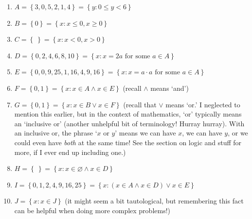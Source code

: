 \documentclass[10pt]{article}
\theoremstyle{definition}
\newcommand{\set}[1]{\left\{ #1 \right\}}
\begin{document}
\begin{enumerate}
    \item $A = \set{3,0,5,2,1,4} = \set{y:0\leq y<6}$
    \item $B = \set{0} = \set{x:x\leq 0, x\geq 0}$
    \item $C = \set{~} = \set{x:x<0,x>0}$
    \item $D = \set{0,2,4,6,8,10} = \set{x:x=2a\text{ for some }a\in A}$
    \item $E = \set{0,0,9,25,1,16,4,9,16} = \set{x:x=a\cdot a \text{ for some }a\in A}$
    \item $F = \set{0,1} = \set{x:x\in A \land x\in E}$ (recall $\land$ means `and')
    \item $G = \set{0,1} = \set{x:x\in B \lor x\in F}$ (recall that $\lor$ means `or.'  I neglected to mention this earlier, but in the context of mathematics, `or' typically means an `inclusive or' (another unhelpful bit of terminology! Hurray hurray).  With an inclusive or, the phrase `$x$ or $y$' means we can have $x$, we can have $y$, or we could even have \emph{both} at the same time!  See the section on logic and stuff for more, if I ever end up including one.)
    \item $H = \set{~} = \set{x:x\in \varnothing\land x\in D}$
    \item $I = \set{0,1,2,4,9,16,25} = \set{x:(x\in A\land x\in D)\lor x\in E}$
    \item $J = \set{x:x\in J}$ (it might seem a bit tautological, but remembering this fact can be helpful when doing more complex problems!)
\end{enumerate}
\end{document}

